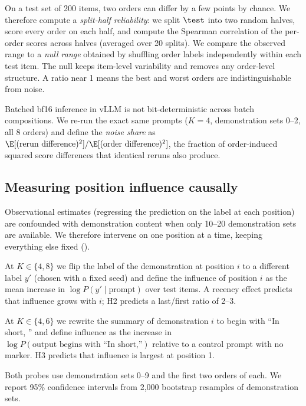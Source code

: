 On a test set of 200 items, two orders can differ by a few points by chance.
We therefore compute a \emph{split-half reliability}: we split $\test$ into two random halves, score every order on each half, and compute the Spearman correlation of the per-order scores across halves (averaged over 20 splits).
We compare the observed range to a \emph{null range} obtained by shuffling order labels independently within each test item. The null keeps item-level variability and removes any order-level structure.
A ratio near 1 means the best and worst orders are indistinguishable from noise.

\label{sec:noise}
Batched bf16 inference in vLLM is not bit-deterministic across batch compositions.
We re-run the exact same prompts ($K=4$, demonstration sets 0--2, all 8 orders) and define the \emph{noise share} as $\E[(\text{rerun difference})^2] / \E[(\text{order difference})^2]$, the fraction of order-induced squared score differences that identical reruns also produce.

\subsection{Measuring position influence causally}

Observational estimates (\eg regressing the prediction on the label at each position) are confounded with demonstration content when only 10--20 demonstration sets are available.
We therefore intervene on one position at a time, keeping everything else fixed ().

At $K\in\{4,8\}$ we flip the label of the demonstration at position $i$ to a different label $y'$ (chosen with a fixed seed) and define the influence of position $i$ as the mean increase in $\log P(y'\mid\text{prompt})$ over test items.
A recency effect predicts that influence grows with $i$; H2 predicts a last/first ratio of 2--3.

At $K\in\{4,6\}$ we rewrite the summary of demonstration $i$ to begin with ``In short, '' and define influence as the increase in $\log P(\text{output begins with ``In short,''})$ relative to a control prompt with no marker.
H3 predicts that influence is largest at position 1.

Both probes use demonstration sets 0--9 and the first two orders of each. We report 95\% confidence intervals from 2,000 bootstrap resamples of demonstration sets.

